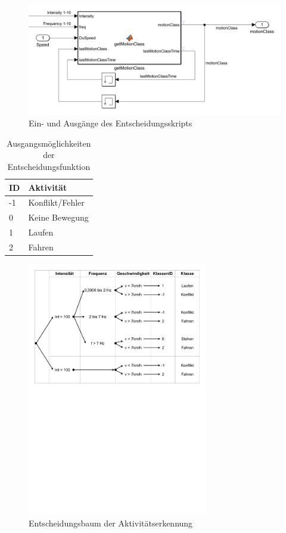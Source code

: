 \begin{figure}[htpb]
	\centering
	\includegraphics[width=\linewidth]{Bilder/getMotionClass_mFile.png}
	\caption{Ein- und Ausgänge des Entscheidungsskripts}
	\label{fig:getMotionClass_mFile}
\end{figure}

\begin{table}[htpb]
	\caption{Ausgangsmöglichkeiten der Entscheidungsfunktion} 
	\centering
	\begin{tabular}{|l|l|}%
			\hline
			\textbf{ID} & \textbf{Aktivität} \\
			\hline
			-1 & Konflikt/Fehler \\
			\hline
			0 & Keine Bewegung \\
			\hline
			1 & Laufen \\
			\hline
			2 & Fahren \\
			\hline
		\end{tabular}
	\label{tab:MotionClass}
\end{table}

\begin{figure}[htpb]
	\centering
	\includegraphics[width=0.7\textwidth]{Bilder/Diagramm_Entscheidungbaum_PDF.pdf}
	\caption{Entscheidungsbaum der Aktivitätserkennung}
	\label{fig:Lauferkennung_FFT_Entscheidungsbaum_mFile}
\end{figure}

